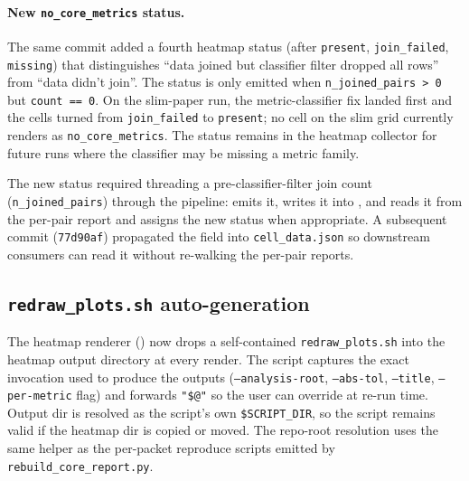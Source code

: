 \documentclass[11pt]{article}
\begin{document}
\paragraph{New \texttt{no\_core\_metrics} status.}
The same commit added a fourth heatmap status (after
  \texttt{present}, \texttt{join\_failed}, \texttt{missing}) that
  distinguishes ``data joined but classifier filter dropped all
  rows'' from ``data didn't join''.
The status is only emitted when \texttt{n\_joined\_pairs > 0} but
  \texttt{count == 0}.
On the slim-paper run, the metric-classifier fix landed first and
  the  cells turned from
  \texttt{join\_failed} to \texttt{present}; no cell on the slim grid
  currently renders as \texttt{no\_core\_metrics}.
The status remains in the heatmap collector for future runs where the
  classifier may be missing a metric family.

The new status required threading a pre-classifier-filter join count
  (\texttt{n\_joined\_pairs}) through the pipeline:
   emits it,
   writes it into
  , and
   reads it from
  the per-pair report and assigns the new status when appropriate.
A subsequent commit (\texttt{77d90af}) propagated the field into
  \texttt{cell\_data.json} so downstream consumers can read it
  without re-walking the per-pair reports.

\subsection{\texorpdfstring{\texttt{redraw\_plots.sh}}{redraw\_plots.sh} auto-generation}
\label{sec:tr-tooling-redraw-plots}

The heatmap renderer
  () now drops a
  self-contained \texttt{redraw\_plots.sh} into the heatmap output
  directory at every render.
The script captures the exact invocation used to produce the
  outputs (\texttt{--analysis-root}, \texttt{--abs-tol},
  \texttt{--title}, \texttt{--per-metric} flag) and forwards
  \texttt{"\$@"} so the user can override at re-run time.
Output dir is resolved as the script's own \texttt{\$SCRIPT\_DIR},
  so the script remains valid if the heatmap dir is copied or moved.
The repo-root resolution uses the same
   helper as the per-packet
  reproduce scripts emitted by \texttt{rebuild\_core\_report.py}.
\end{document}
